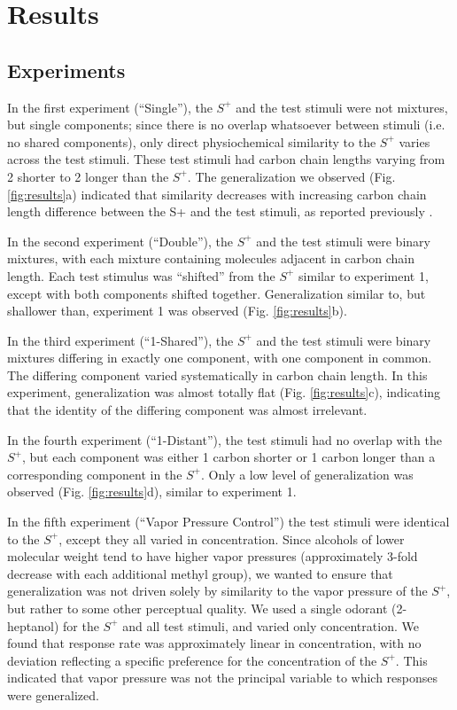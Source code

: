 \section*{Results}
\label{results}
\subsection*{Experiments}
\label{results_experiments}
In the first experiment (``Single''), the $S^+$ and the test stimuli were not mixtures, but single components; since there is no overlap whatsoever between stimuli (i.e. no shared components), only direct physiochemical similarity to the $S^+$ varies across the test stimuli.  
These test stimuli had carbon chain lengths varying from 2 shorter to 2 longer than the $S^+$.  
The generalization we observed (Fig. \ref{fig:results}a) indicated that similarity decreases with increasing carbon chain length difference between the S+ and the test stimuli, as reported previously \cite{18810459}\cite{24488965}.  

In the second experiment (``Double''), the $S^+$ and the test stimuli were binary mixtures, with each mixture containing molecules adjacent in carbon chain length.  
Each test stimulus was ``shifted'' from the $S^+$ similar to experiment 1, except with both components shifted together.  
Generalization similar to, but shallower than, experiment 1 was observed (Fig. \ref{fig:results}b).  

In the third experiment (``1-Shared''), the $S^+$ and the test stimuli were binary mixtures differing in exactly one component, with one component in common.  
The differing component varied systematically in carbon chain length.  
In this experiment, generalization was almost totally flat (Fig. \ref{fig:results}c), indicating that the identity of the differing component was almost irrelevant.  

In the fourth experiment (``1-Distant''), the test stimuli had no overlap with the $S^+$, but each component was either 1 carbon shorter or 1 carbon longer than a corresponding component in the $S^+$.  Only a low level of generalization was observed (Fig. \ref{fig:results}d), similar to experiment 1.  

In the fifth experiment (``Vapor Pressure Control'') the test stimuli were identical to the $S^+$, except they all varied in concentration.  
Since alcohols of lower molecular weight tend to have higher vapor pressures (approximately 3-fold decrease with each additional methyl group), we wanted to ensure that generalization was not driven solely by similarity to the vapor pressure of the $S^+$, but rather to some other perceptual quality.  
We used a single odorant (2-heptanol) for the $S^+$ and all test stimuli, and varied only concentration.  
We found that response rate was approximately linear in concentration, with no deviation reflecting a specific preference for the concentration of the $S^+$.  
This indicated that vapor pressure was not the principal variable to which responses were generalized.  